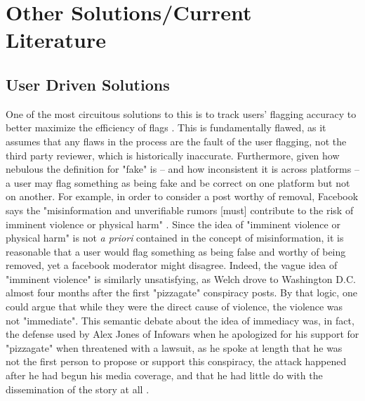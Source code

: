 \section{Other Solutions/Current Literature}

\subsection{User Driven Solutions}
One of the most circuitous solutions to this is to track users' flagging accuracy to better maximize the efficiency of flags \citep{tschiatschek2018fake}. This is fundamentally flawed, as it assumes that any flaws in the process are the fault of the user flagging, not the third party reviewer, which is historically inaccurate. Furthermore, given how nebulous the definition for "fake" is -- and how inconsistent it is across platforms -- a user may flag something as being fake and be correct on one platform but not on another. For example, in order to consider a post worthy of removal, Facebook says the "misinformation and unverifiable rumors [must] contribute to the risk of imminent violence or physical harm" \citep{facebook2020violence}. Since the idea of "imminent violence or physical harm" is not \textit{a priori} contained in the concept of misinformation, it is reasonable that a user would flag something as being false and worthy of being removed, yet a facebook moderator might disagree. Indeed, the vague idea of "imminent violence" is similarly unsatisfying, as Welch drove to Washington D.C. almost four months after the first "pizzagate" conspiracy posts. By that logic, one could argue that while they were the direct cause of violence, the violence was not "immediate". This semantic debate about the idea of immediacy was, in fact, the defense used by Alex Jones of Infowars when he apologized for his support for "pizzagate" when threatened with a lawsuit, as he spoke at length that he was not the first person to propose or support this conspiracy, the attack happened after he had begun his media coverage, and that he had little do with the dissemination of the story at all \citep{rosenberg2017alex}. 

\subsection{}